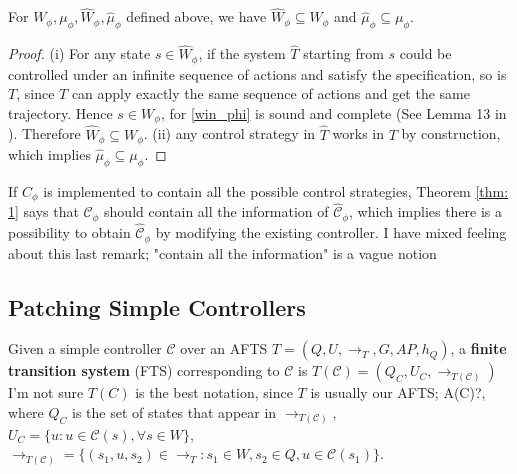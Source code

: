 \begin{theorem}
	For $ W_{\phi}, \mu_{\phi}, \widehat{W}_{\phi}, \widehat{\mu}_{\phi} $ defined above, we have $ \widehat{W}_{\phi} \subseteq W_{\phi}  $ and $ \widehat{\mu}_{\phi} \subseteq \mu_{\phi}$\label{thm: 1}.
\end{theorem}

\begin{proof}
	(i) For any state $ s\in \widehat{W}_{\phi} $, if the system $ \widehat{T} $ starting from $ s $ could be controlled under an infinite sequence of actions and satisfy the specification, so is $ T $, since $ T $ can apply exactly the same sequence of actions and get the same trajectory. Hence $ s\in W_{\phi} $, for \eqref{win_phi} is sound and complete (See Lemma 13 in \cite{Nilsson2017}). Therefore $ \widehat{W}_{\phi}\subseteq W_{\phi} $. (ii) any control strategy in $ \widehat{T} $ works in $ T $ by construction, which implies $ \widehat{\mu}_{\phi} \subseteq \mu_{\phi}$.
\end{proof}

If $ C_{\phi} $ is implemented to contain all the possible control strategies, Theorem \ref{thm: 1} says that $ \mathcal{C}_{\phi} $ should contain all the information of $ \widehat{\mathcal{C}}_{\phi} $, which implies there is a possibility to obtain $ \widehat{\mathcal{C}}_{\phi} $ by modifying the existing controller. {\color{purple} I have mixed feeling about this last remark; "contain all the information" is a vague notion}



\subsection{Patching Simple Controllers}
\label{sec:patching_simple}
\begin{definition}
	Given a simple controller $ \mathcal{C} $ over an AFTS $T = (Q,U,\rightarrow_T, G,AP,h_Q) $, a \textbf{finite transition system} (FTS) corresponding to $ \mathcal{C} $ is $T(\mathcal{C}) = (Q_C, U_C, \rightarrow_{T(\mathcal{C})})$ {\color{purple} I'm not sure $T(C)$ is the best notation, since $T$ is usually our AFTS; A(C)?}, where $ Q_C $ is the set of states that appear in $ \rightarrow_{T(\mathcal{C})} $, $ U_C=\{u: u\in \mathcal{C}(s), \forall s\in W\} $, $ \rightarrow_{T(\mathcal{C})} =\{(s_1,u,s_2)\in \rightarrow_T: s_1\in W,s_2\in Q, u\in \mathcal{C}(s_1)\} $. \label{def:T_C}
\end{definition}


